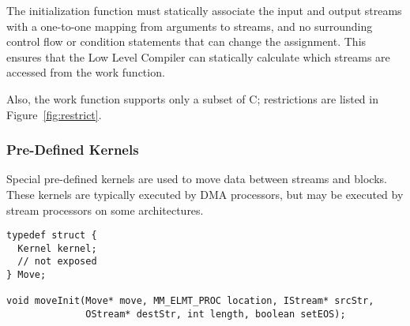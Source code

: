 
The initialization function must statically associate the input and
output streams with a one-to-one mapping from arguments to streams,
and no surrounding control flow or condition statements that can
change the assignment.  This ensures that the Low Level Compiler can
statically calculate which streams are accessed from the work
function.

Also, the work function supports only a subset of C; restrictions are
listed in Figure~\ref{fig:restrict}.

\subsubsection{Pre-Defined Kernels}
\label{sec:kernelsvm}

\label{sec:predef}

Special pre-defined kernels are used to move data between streams and
blocks. These kernels are typically executed by DMA processors, but
may be executed by stream processors on some architectures.

\makeline
{}

\makeline
\clearpage
\makeline
{}
{\small
\begin{verbatim}
typedef struct {
  Kernel kernel;
  // not exposed
} Move;

void moveInit(Move* move, MM_ELMT_PROC location, IStream* srcStr, 
              OStream* destStr, int length, boolean setEOS);
\end{verbatim}}



